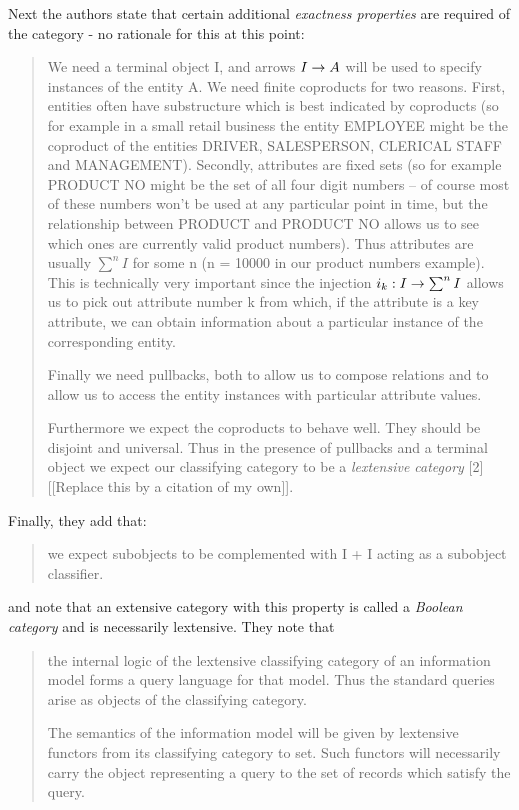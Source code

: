 \documentclass[11pt,a4paper]{scrartcl}
\begin{document}
Next the authors state that certain additional \textit{exactness properties} are required of the category
- no rationale for this at this point:
\begin{quote}
We need a terminal object I, 
and arrows $I \rightarrow A$ will be used to specify instances of the entity A. We
need finite coproducts for two reasons. First, entities often have substructure
which is best indicated by coproducts (so for example in a small retail 
business the entity EMPLOYEE might be the coproduct of the entities DRIVER,
SALESPERSON, CLERICAL STAFF and MANAGEMENT). Secondly, attributes
are fixed sets (so for example PRODUCT NO might be the set of all four digit
numbers -- of course most of these numbers won't be used at any particular point
in time, but the relationship between PRODUCT and PRODUCT NO allows us
to see which ones are currently valid product numbers). Thus attributes are
usually $\sum^nI $ for some n (n = 10000 in our product numbers example). This
is technically very important since the injection $i_k:I \rightarrow \sum^nI$  allows us to
pick out attribute number k from which, if the attribute is a key attribute, we
can obtain information about a particular instance of the corresponding entity.

Finally we need pullbacks, both to allow us to compose relations and to allow
us to access the entity instances with particular attribute values.

Furthermore we expect the coproducts to behave well. They should be
disjoint and universal. Thus in the presence of pullbacks and a 
terminal object
we expect our classifying category to be a \textit{lextensive category} [2] [[Replace this by a citation of my own]].
\end{quote}
Finally, they add that:
\begin{quote}
we expect subobjects to be complemented with I + I acting as
a subobject classifier. 
\end{quote}
and note that an extensive category with this property is called a
\textit{Boolean category} and is necessarily lextensive. 
They note that
\begin{quote}
 the internal logic of the lextensive
classifying category of an information model forms a query language for that
model. Thus the standard queries arise as objects of the classifying category.

The semantics of the information model will be given by lextensive functors
from its classifying category to set. Such functors will necessarily carry the
object representing a query to the set of records which satisfy the query.
\end{quote}
\end{document}
